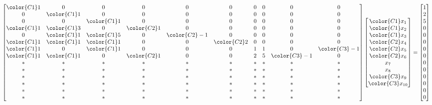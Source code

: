 \begin{equation*}
    \begin{bmatrix}
         \color{C1} 1 & 0 & 0 &  0 &  0 &  0 &  0 &  0 & 0 &  0 \\
         0 & \color{C1} 1 & 0 &  0 &  0 &  0 &  0 &  0 & 0 &  0 \\
         0 & 0 & \color{C1} 1 &  0 &  0 &  0 &  0 &  0 & 0 &  0 \\
         \color{C1}1 & \color{C1}3 & 0 &  \color{C2} 1 &  0 &  0 &  0 &  0 & 0 &  0 \\
         0 & \color{C1}1 & \color{C1}5 &  0 &  \color{C2} -1 &  0 &  0 &  0 & 0 &  0 \\
         \color{C1}1 & \color{C1}1 & \color{C1}1 &  0 &  0 &  \color{C2} 2 &  0 &  0 & 0 &  0 \\
         \color{C1}1 & 0 & \color{C1}1 &  0 &  0 &  0 &  1 &  1 & 0 & \color{C3}-1 \\
         \color{C1}1 & \color{C1}1 & 0 &  \color{C2}1 &  0 &  0 &  2 &  5 & \color{C3}-1 &  0 \\
         * & * & * &  * &  * &  * &  * &  * & * &  *\\
         * & * & * &  * &  * &  * &  * &  * & * &  *\\
         * & * & * &  * &  * &  * &  * &  * & * &  *\\
         * & * & * &  * &  * &  * &  * &  * & * &  *\\
         * & * & * &  * &  * &  * &  * &  * & * &  *\\
         * & * & * &  * &  * &  * &  * &  * & * &  *\\
    \end{bmatrix}
    \begin{bmatrix}
        \color{C1} x_1 \\ 
        \color{C1} x_2 \\ 
        \color{C1} x_3 \\ 
        \color{C2} x_4 \\ 
        \color{C2} x_5 \\ 
        \color{C2} x_6 \\ 
        x_7 \\ 
        x_8 \\ 
        \color{C3} x_9 \\ 
        \color{C3} x_{10} 
    \end{bmatrix}
    =
    \begin{bmatrix}
        1 \\ 2 \\ 5 \\ 0 \\ 0 \\ 0 \\ 0 \\ 0 \\ 0 \\ 0 \\ 0 \\ 0 \\ 0 \\ 0 
    \end{bmatrix}
\end{equation*}
